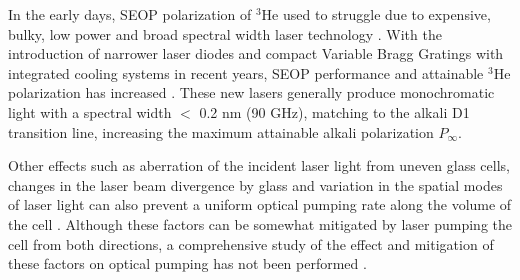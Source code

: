 
In the early days, SEOP polarization of $^3$He used to struggle due to expensive, bulky, low power and broad spectral width laser technology \cite{Chupp1987, Wagshul1989, Coulter1990}. With the introduction of narrower laser diodes and compact Variable Bragg Gratings with integrated cooling systems in recent years, SEOP performance and attainable $^3$He polarization has increased \cite{Volodin2004, Chen2014}. These new lasers generally produce monochromatic light with a spectral width $<$ 0.2 nm (90 GHz), matching to the alkali D1 transition line, increasing the maximum attainable alkali polarization $P_{\infty}$. 

Other effects such as aberration of the incident laser light from uneven glass cells, changes in the laser beam divergence by glass and variation in the spatial modes of laser light can also prevent a uniform optical pumping rate along the volume of the cell \cite{Chann2003, Chen2014}. Although these factors can be somewhat mitigated by laser pumping the cell from both directions, a comprehensive study of the effect and mitigation of these factors on optical pumping has not been performed \cite{Chann2003, Chen2014}.


